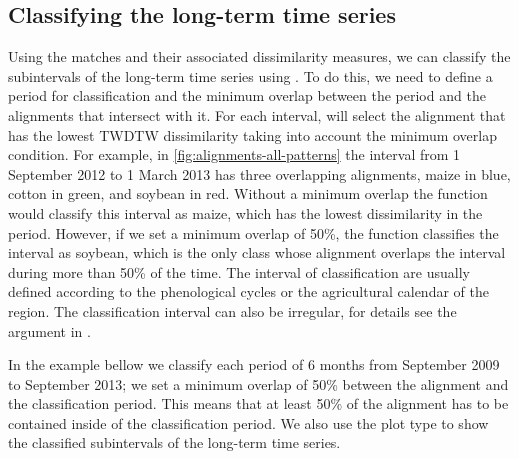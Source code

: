 \documentclass[article,shortnames]{jss}
\begin{document}
\hypertarget{classifying-the-long-term-time-series}{%
\subsection{Classifying the long-term time
series}\label{classifying-the-long-term-time-series}}

Using the matches and their associated dissimilarity measures, we can
classify the subintervals of the long-term time series using
. To do this, we need to define a period for
classification and the minimum overlap between the period and the
alignments that intersect with it. For each interval,
 will select the alignment that has the lowest TWDTW
dissimilarity taking into account the minimum overlap condition. For
example, in \autoref{fig:alignments-all-patterns} the interval from 1
September 2012 to 1 March 2013 has three overlapping alignments, maize
in blue, cotton in green, and soybean in red. Without a minimum overlap
the function  would classify this interval as maize,
which has the lowest dissimilarity in the period. However, if we set a
minimum overlap of 50\%, the function  classifies
the interval as soybean, which is the only class whose alignment
overlaps the interval during more than 50\% of the time. The interval of
classification are usually defined according to the phenological cycles
or the agricultural calendar of the region. The classification interval
can also be irregular, for details see the argument  in
.

In the example bellow we classify each period of 6 months from September
2009 to September 2013; we set a minimum overlap of 50\% between the
alignment and the classification period. This means that at least 50\%
of the alignment has to be contained inside of the classification
period. We also use the plot type  to show the
classified subintervals of the long-term time series.
\end{document}
